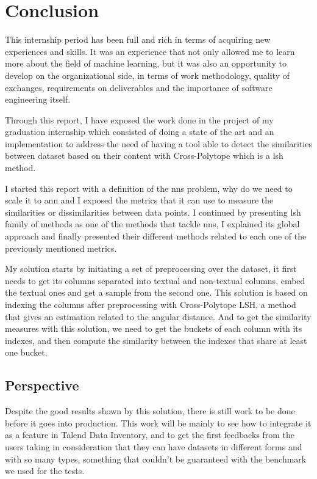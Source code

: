 \chapter*{Conclusion}

This internship period has been full and rich in terms of acquiring new
experiences and skills. It was an experience that not only allowed me to learn
more about the field of machine learning, but it was also an opportunity to
develop on the organizational side, in terms of work methodology, quality of
exchanges, requirements on deliverables and the importance of software
engineering itself. 


Through this report, I have exposed the work done in the project of my graduation
internship which consisted of doing a state of the art and an implementation to
address the need of having a tool able to detect the similarities between
dataset based on their content with Cross-Polytope which is a \acrfull{lsh}
method.

I started this report with a definition of the \acrfull{nns} problem, why do we
need to scale it to \acrfull{ann} and I exposed the metrics that it can use to
measure the similarities or dissimilarities between data points. I continued by
presenting \acrshort{lsh} family of methods as one of the methods that tackle
\acrshort{nns}, I explained its global approach and finally presented their
different methods related to each one of the previously mentioned metrics.

My solution starts by initiating a set of preprocessing over the dataset, it
first needs to get its columns separated into textual and non-textual columns,
embed the textual ones and get a sample from the second one. This solution is
based on indexing the columns after preprocessing with Cross-Polytope LSH, a
method that gives an estimation related to the angular distance. And to get the
similarity measures with this solution, we need to get the buckets of each
column with its indexes, and then compute the similarity between the indexes
that share at least one bucket.


\section*{Perspective}
Despite the good results shown by this solution, there is still work to be done
before it goes into production. This work will be mainly to see how to integrate
it as a feature in Talend Data Inventory, and to get the first feedbacks from
the users taking in consideration that they can have datasets in different forms
and with so many types, something that couldn't be guaranteed with the benchmark
we used for the tests.